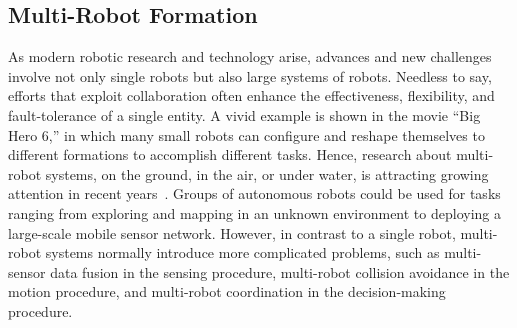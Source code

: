 \subsection{Multi-Robot Formation}

As modern robotic research and technology arise, advances and new challenges
involve not only single robots but also large systems of robots. 
Needless to say, efforts that exploit collaboration often enhance the effectiveness, flexibility, and
fault-tolerance of a single entity. 
A vivid example is shown in the movie ``Big Hero 6,'' in which many small robots can configure and reshape themselves to different formations to accomplish different tasks.
Hence, research about multi-robot systems, on the ground, in the air, or under water, is attracting growing attention in recent years~\cite{CaoFukKahMen95, DudJenMilWil96, BahSoySah03}. 
Groups of autonomous robots could be used for tasks ranging from exploring and mapping in an unknown environment to deploying a large-scale mobile sensor network. 
However, in contrast to a single robot, multi-robot systems normally introduce more complicated problems, such as multi-sensor data fusion in the sensing procedure, multi-robot collision
avoidance in the motion procedure, and multi-robot coordination in the decision-making procedure.

